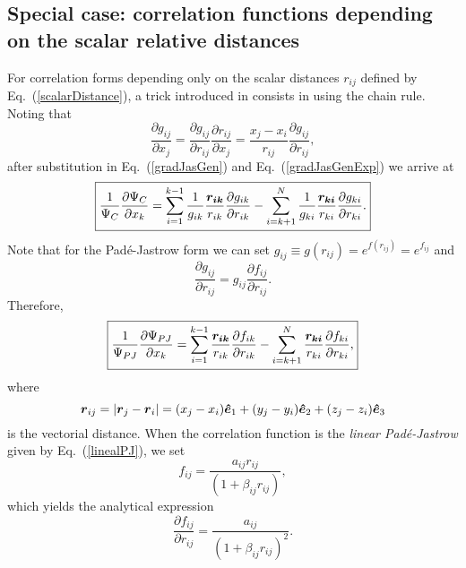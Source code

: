 \subsection{Special case: correlation functions depending on the scalar relative distances}
For correlation forms depending only on the scalar distances $r_{ij}$ defined by Eq.~(\ref{scalarDistance}), a trick introduced in \cite{Albrigtsen} consists in using the chain rule. Noting that 
\begin{equation}\label{chainRule}
\frac{\partial g_{ij}}{\partial x_j} = \frac{\partial g_{ij}}{\partial r_{ij}} \frac{\partial r_{ij}}{\partial x_j} = \frac{x_j - x_i}{r_{ij}} \frac{\partial g_{ij}}{\partial r_{ij}},
\end{equation}
after substitution in Eq.~(\ref{gradJasGen}) and Eq.~(\ref{gradJasGenExp}) we arrive at
\begin{equation}\label{generalCorrelation}
\boxed{
\frac{1}{\Psi_C}\frac{\partial \Psi_C}{\partial x_k} = 
\sum_{i=1}^{k-1}\frac{1}{g_{ik}} \frac{\boldsymbol{r_{ik}}}{r_{ik}} \frac{\partial g_{ik}}{\partial r_{ik}}
-
\sum_{i=k+1}^{N}\frac{1}{g_{ki}}\frac{\boldsymbol{r_{ki}}}{r_{ki}}\frac{\partial g_{ki}}{\partial r_{ki}}.
}
\end{equation}
Note that for the Pad\'e-Jastrow form we can set $g_{ij} \equiv g(r_{ij}) = e^{f(r_{ij})} = e^{f_{ij}}$ and 
\begin{equation}
\frac{\partial g_{ij}}{\partial r_{ij}} = g_{ij} \frac{\partial f_{ij}}{\partial r_{ij}}.
\end{equation}
Therefore, 
\begin{equation}\label{padeJastrowGradJasRatio}
\boxed{
\frac{1}{\Psi_{PJ}}\frac{\partial \Psi_{PJ}}{\partial x_k} =
\sum_{i=1}^{k-1}\frac{\boldsymbol{r_{ik}}}{r_{ik}}\frac{\partial f_{ik}}{\partial r_{ik}}
-
\sum_{i=k+1}^{N}\frac{\boldsymbol{r_{ki}}}{r_{ki}}\frac{\partial f_{ki}}{\partial r_{ki}},
}
\end{equation}
where 
\begin{equation}\label{distanceVector}
 \boldsymbol{r}_{ij} = |\boldsymbol{r}_j - \boldsymbol{r}_i| = (x_j - x_i)\mbox{\boldmath$\hat{e}$\unboldmath}_1 + (y_j - y_i)\mbox{\boldmath$\hat{e}$\unboldmath}_2 + (z_j - z_i)\mbox{\boldmath$\hat{e}$\unboldmath}_3
\end{equation}
is the vectorial distance. When the correlation function is the \emph{linear Pad\'e-Jastrow} given by Eq.~(\ref{linealPJ}), we set \begin{equation}
f_{ij} = \frac{a_{ij} r_{ij}}{(1 + \beta_{ij} r_{ij})},
\end{equation}
which yields the analytical expression
\begin{equation}\label{analyticalPJGrad}
 \boxed{\frac{\partial f_{ij}}{\partial r_{ij}} = \frac{a_{ij}}{(1 + \beta_{ij} r_{ij})^2}}.
\end{equation}



